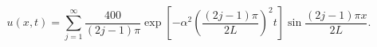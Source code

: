 \[u(x,t)=\sum_{j=1}^{\infty}\frac{400}{(2j-1)\pi}\exp\!\left[-\alpha^2\left(\frac{(2j-1)\pi}{2L}\right)^2t\right]\sin\frac{(2j-1)\pi x}{2L}.\]
